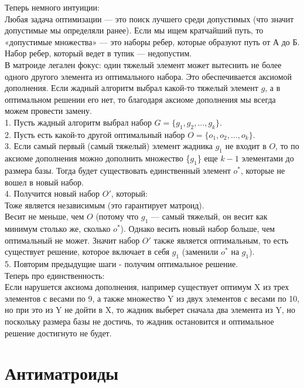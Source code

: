 \begin{tcolorbox}[colback=gray!5!white, colframe=gray!75!black]
Теперь немного интуиции: \\
Любая задача оптимизации — это поиск лучшего среди допустимых (что значит допустимые мы определяли ранее). Если мы ищем кратчайший путь, то «допустимые множества» — это наборы ребер, которые образуют путь от А до Б. Набор ребер, который ведет в тупик — недопустим. \\
В матроиде легален фокус: один тяжелый элемент может вытеснить не более одного другого элемента из оптимального набора. Это обеспечивается аксиомой дополнения. Если жадный алгоритм выбрал какой-то тяжелый элемент $g$, а в оптимальном решении его нет, то благодаря аксиоме дополнения мы всегда можем провести замену. \\

1. Пусть жадный алгоритм выбрал набор $G = \{g_1, g_2, \dots, g_k\}$. \\
2. Пусть есть какой-то другой оптимальный набор $O = \{o_1, o_2, \dots, o_k\}$. \\
3. Если самый первый (самый тяжелый) элемент жадника $g_1$ не входит в $O$, то по аксиоме дополнения можно дополнить множество \{$g_1$\} еще $k-1$ элементами до размера базы. Тогда будет существовать единственный элемент $o^*$, которые не вошел в новый набор. \\
4. Получится новый набор $O'$, который: \\
Тоже является независимым (это гарантирует матроид). \\
Весит не меньше, чем $O$ (потому что $g_1$ — самый тяжелый, он весит как минимум столько же, сколько $o^*$). Однако весить новый набор больше, чем оптимальный не может. Значит набор $O'$ также является оптимальным, то есть существует решение, которое включает в себя $g_1$ (заменили $o^*$ на $g_1$).\\
5. Повторим предыдущие шаги - получим оптимальное решение. \\

Теперь про единственность: \\
Если нарушется аксиома дополнения, например существует оптимум X из трех элементов с весами по 9, а также множество Y из двух элементов с весами по 10, но при это из Y не дойти в X, то жадник выберет сначала два элемента из Y, но поскольку размера базы не достичь, то жадник остановится и оптимальное решение достигнуто не будет.
\end{tcolorbox}

\section{Антиматроиды}

